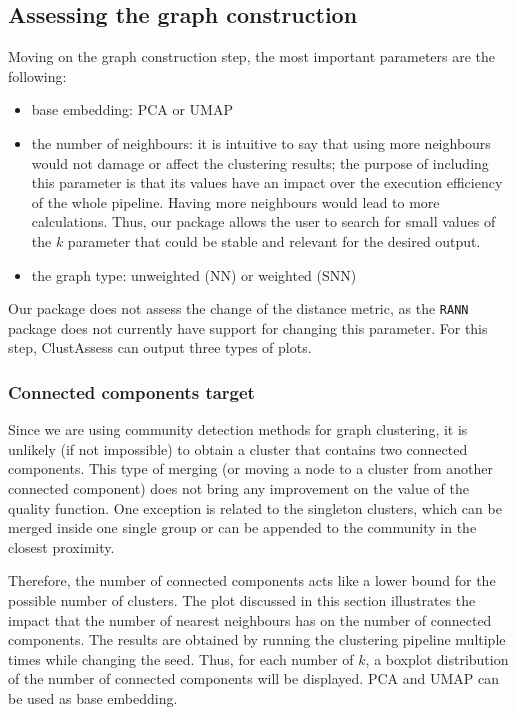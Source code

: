 \subsection{Assessing the graph construction}
Moving on the graph construction step, the most important parameters are the following:
\begin{itemize}
    \item base embedding: PCA or UMAP
    \item the number of neighbours: it is intuitive to say that using more neighbours would not damage or affect the clustering results; the purpose of including this parameter is that its values have an impact over the execution efficiency of the whole pipeline. Having more neighbours would lead to more calculations. Thus, our package allows the user to search for small values of the $k$ parameter that could be stable and relevant for the desired output.
    \item the graph type: unweighted (NN) or weighted (SNN)
\end{itemize}

Our package does not assess the change of the distance metric, as the \verb|RANN| package does not currently have support for changing this parameter.
For this step, ClustAssess can output three types of plots.

\subsubsection{Connected components target}
Since we are using community detection methods for graph clustering, it is unlikely (if not impossible) to obtain a cluster that contains two connected components. This type of merging (or moving a node to a cluster from another connected component) does not bring any improvement on the value of the quality function. One exception is related to the singleton clusters, which can be merged inside one single group or can be appended to the community in the closest proximity.

Therefore, the number of connected components acts like a lower bound for the possible number of clusters. The plot discussed in this section illustrates the impact that the number of nearest neighbours has on the number of connected components. The results are obtained by running the clustering pipeline multiple times while changing the seed. Thus, for each number of $k$, a boxplot distribution of the number of connected components will be displayed. PCA and UMAP can be used as base embedding. 

